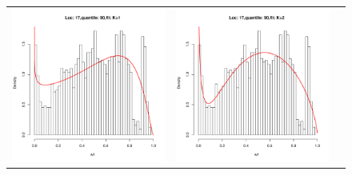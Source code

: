 \begin{figure}[h]
\begin{tabular}{ccc}
\includegraphics[width=\textwidth/3]{../img/loc17/quantile90/fit_K1.pdf}
&
\includegraphics[width=\textwidth/3]{../img/loc17/quantile90/fit_K2.pdf}
&

\end{tabular}
\end{figure}
